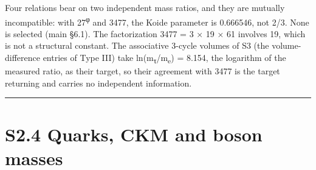 \documentclass[11pt,a4paper]{article}
\begin{document}
Four relations bear on two independent mass ratios, and they are mutually incompatible: with 27\textsuperscript{φ} and 3477, the Koide parameter is 0.666546, not 2/3. None is selected (main §6.1). The factorization 3477 = 3 × 19 × 61 involves 19, which is not a structural constant. The associative 3-cycle volumes of S3 (the volume-difference entries of Type III) take ln(m\textsubscript{τ}/m\textsubscript{e}) = 8.154, the logarithm of the measured ratio, as their target, so their agreement with 3477 is the target returning and carries no independent information.

\begin{center}\rule{\linewidth}{0.5pt}\end{center}

\section{S2.4 Quarks, CKM and boson masses}\label{s2.4-quarks-ckm-and-boson-masses}
\end{document}

